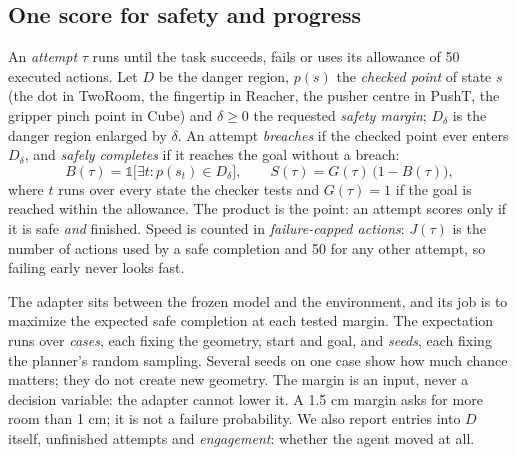 \documentclass[sigconf,nonacm]{acmart}
\begin{document}
\subsection{One score for safety and progress}\label{sec:success}
An \emph{attempt} $\tau$ runs until the task succeeds, fails or uses its
allowance of 50 executed actions. Let $D$ be the danger region, $p(s)$ the
\emph{checked point} of state $s$ (the dot in TwoRoom, the fingertip in
Reacher, the pusher centre in PushT, the gripper pinch point in Cube) and
$\delta\ge0$ the requested \emph{safety margin}; $D_\delta$ is the danger
region enlarged by $\delta$. An attempt \emph{breaches} if the checked point
ever enters $D_\delta$, and \emph{safely completes} if it reaches the goal
without a breach:
\begin{equation}\label{eq:safe}
B(\tau)=\mathds 1\bigl[\exists t: p(s_t)\in D_\delta\bigr],\qquad
S(\tau)=G(\tau)\,\bigl(1-B(\tau)\bigr),
\end{equation}
where $t$ runs over every state the checker tests and $G(\tau)=1$ if the
goal is reached within the allowance. The product is the point: an attempt
scores only if it is safe \emph{and} finished. Speed is counted in
\emph{failure-capped actions}: $J(\tau)$ is the number of actions used by a
safe completion and 50 for any other attempt, so failing early never looks
fast.

The adapter sits between the frozen model and the environment, and its job
is to maximize the expected safe completion at each tested margin. The
expectation runs over \emph{cases}, each fixing the geometry, start and
goal, and \emph{seeds}, each fixing the planner's random sampling. Several
seeds on one case show how much chance matters; they do not create new
geometry. The margin is an input, never a decision variable: the adapter
cannot lower it. A 1.5 cm margin asks for more room than 1 cm; it is not a
failure probability. We also report entries into $D$ itself, unfinished
attempts and \emph{engagement}: whether the agent moved at all.
\end{document}
